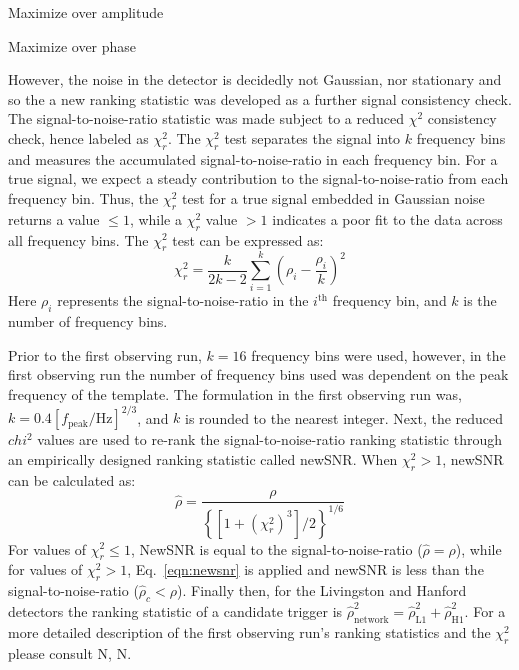 Maximize over amplitude

Maximize over phase

However, the noise in the detector is decidedly not Gaussian, nor stationary and so the a new ranking statistic was developed as a further signal consistency check. The signal-to-noise-ratio statistic was made subject to a reduced $\chi^2$ consistency check, hence labeled as $\chi_r^2$. The $\chi_r^2$ test separates the signal into $k$ frequency bins and measures the accumulated signal-to-noise-ratio in each frequency bin. For a true signal, we expect a steady contribution to the signal-to-noise-ratio from each frequency bin. Thus, the $\chi_r^2$ test for a true signal embedded in Gaussian noise returns a value $\leq 1$, while a $\chi_r^2$ value $>1$ indicates a poor fit to the data across all frequency bins. The $\chi_r^2$ test can be expressed as:
\begin{equation}\label{eqn:reduced_chi_sq}
    \chi^2_r = \frac{k}{2k-2} \sum^k_{i=1} \left(\rho_i - \frac{\rho_i}{k}\right)^2
\end{equation}
Here $\rho_i$ represents the signal-to-noise-ratio in the $i^{\mathrm{th}}$ frequency bin, and $k$ is the number of frequency bins.

Prior to the first observing run, $k=16$ frequency bins were used, however, in the first observing run the number of frequency bins used was dependent on the peak frequency of the template. The formulation in the first observing run was, $k = 0.4\left[f_\mathrm{peak} / \mathrm{Hz}\right]^{2/3}$, and $k$ is rounded to the nearest integer. Next, the reduced $chi^2$ values are used to re-rank the signal-to-noise-ratio ranking statistic through an empirically designed ranking statistic called newSNR. When $\chi^2_r > 1$, newSNR can be calculated as:
\begin{equation}\label{eqn:newsnr}
    \hat{\rho} = \frac{\rho}
                  {\left\{\left[ 1 + \left(\chi^2_r\right)^3\right]/2\right\}^{1/6}}
\end{equation}
For values of $\chi^2_r \leq 1$, NewSNR is equal to the signal-to-noise-ratio ($\hat{\rho} = \rho$), while for values of $\chi^2_r >1$, Eq.~\ref{eqn:newsnr} is applied and newSNR is less than the signal-to-noise-ratio ($\hat{\rho}_c < \rho$). Finally then, for the Livingston and Hanford detectors the ranking statistic of a candidate trigger is $\hat{\rho}^2_\mathrm{network} = \hat{\rho}_\mathrm{L1}^2 + \hat{\rho}_\mathrm{H1}^2$. For a more detailed description of the first observing run's ranking statistics and the $\chi^2_r$ please consult N, N.

